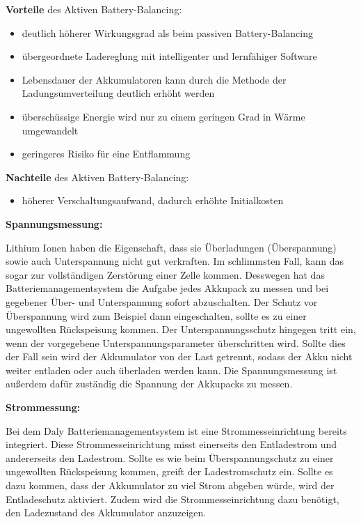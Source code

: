 \textbf{Vorteile} des Aktiven Battery-Balancing:
\begin{itemize}
\item {deutlich höherer Wirkungsgrad als beim passiven Battery-Balancing} \medskip\\
\item {übergeordnete Ladereglung mit intelligenter und lernfähiger Software} \medskip\\
\item {Lebensdauer der Akkumulatoren kann durch die Methode der Ladungsumverteilung deutlich erhöht werden} \medskip\\
\item {überschüssige Energie wird nur zu einem geringen Grad in Wärme umgewandelt} \medskip\\
\item {geringeres Risiko für eine Entflammung} \medskip\\
\end{itemize}

\textbf{Nachteile} des Aktiven Battery-Balancing:
\begin{itemize}
\item {höherer Verschaltungsaufwand, dadurch erhöhte Initialkosten} \medskip\\
\end{itemize}

\textbf{Spannungsmessung:}

Lithium Ionen haben die Eigenschaft, dass sie Überladungen (Überspannung) sowie auch Unterspannung nicht gut verkraften. Im schlimmsten Fall, kann das sogar zur vollständigen Zerstörung einer Zelle kommen. Desswegen hat das Batteriemanagementsystem die Aufgabe jedes Akkupack zu messen und bei gegebener Über- und Unterspannung sofort abzuschalten. Der Schutz vor Überspannung wird zum Beispiel dann eingeschalten, sollte es zu einer ungewollten Rückspeisung kommen. Der Unterspannungsschutz hingegen tritt ein, wenn der vorgegebene Unterspannungsparameter überschritten wird. Sollte dies der Fall sein wird der Akkumulator von der Last getrennt, sodass der Akku nicht weiter entladen oder auch überladen werden kann. Die Spannungsmessung ist außerdem dafür zuständig die Spannung der Akkupacks zu messen.

\textbf{Strommessung:}

Bei dem Daly Batteriemanagementsystem ist eine Strommesseinrichtung bereits integriert. Diese Strommesseinrichtung misst einerseits den Entladestrom und andererseits den Ladestrom. Sollte es wie beim Überspannungschutz zu einer ungewollten Rückspeisung kommen, greift der Ladestromschutz ein. Sollte es dazu kommen, dass der Akkumulator zu viel Strom abgeben würde, wird der Entladeschutz aktiviert. Zudem wird die Strommesseinrichtung dazu benötigt, den Ladezustand des Akkumulator anzuzeigen.

